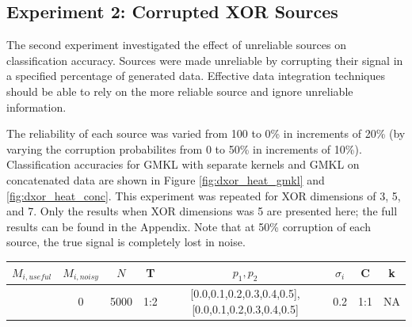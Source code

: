 \documentclass{article}
\begin{document}
\subsection*{Experiment 2: Corrupted XOR Sources}

The second experiment investigated the effect of unreliable sources on
classification accuracy. Sources were made unreliable by corrupting their
signal in a specified percentage of generated data. Effective data integration
techniques should be able to rely on the more reliable source and ignore
unreliable information.

The reliability of each source was varied from 100 to 0\% in increments of 20\%
(by varying the corruption probabilites from 0 to 50\% in increments of 10\%).
Classification accuracies for GMKL with separate kernels and GMKL on
concatenated data are shown in Figure \ref{fig:dxor_heat_gmkl} and
\ref{fig:dxor_heat_conc}. This experiment was repeated for XOR dimensions of 3,
5, and 7. Only the results when XOR dimensions was 5 are presented here; the
full results can be found in the Appendix. Note that at 50\% corruption of each
source, the true signal is completely lost in noise.

\begin{minipage}{\textwidth}
\centering
    \begin{tabular}{|c|c|c|c|c|c|c|c|}
    \hline
    $M_{i,useful}$ & $M_{i, noisy}$ & $N$ & T &  $p_1, p_2$ & $\sigma_i$ & C &  k  \\
    \hline
    [3,5,7] & 0 & 5000 & 1:2 & [0.0,0.1,0.2,0.3,0.4,0.5],[0.0,0.1,0.2,0.3,0.4,0.5] & 0.2 & 1:1 & NA  \\
    \hline
    \end{tabular}
\label{tab:exp_2_params}
\end{minipage}
\end{document}
